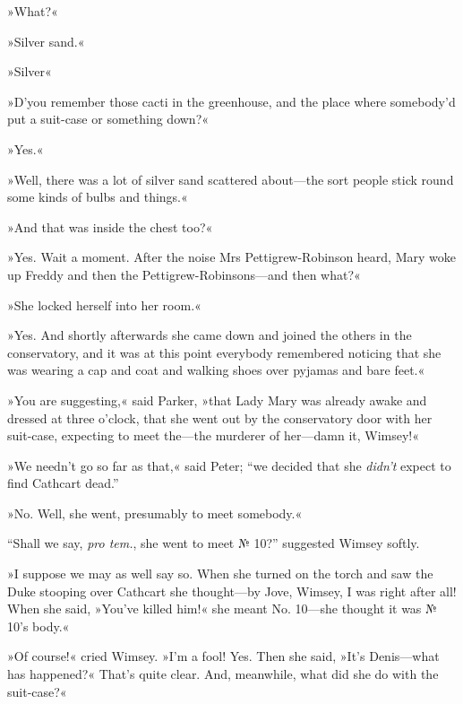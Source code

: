 »What?«

»Silver sand.«

»Silver\longdash«

»D'you remember those cacti in the greenhouse, and the place where somebody'd put a suit-case or something down?«

»Yes.«

»Well, there was a lot of silver sand scattered about\allowbreak---\allowbreak the sort people stick round some kinds of bulbs and things.«

»And that was inside the chest too?«

»Yes. Wait a moment. After the noise Mrs Pettigrew-Robinson heard, Mary woke up Freddy and then the Pettigrew-Robinsons\allowbreak---\allowbreak and then what?«

»She locked herself into her room.«

»Yes. And shortly afterwards she came down and joined the others in the conservatory, and it was at this point everybody remembered noticing that she was wearing a cap and coat and walking shoes over pyjamas and bare feet.«

»You are suggesting,« said Parker, »that Lady Mary was already awake and dressed at three o'clock, that she went out by the conservatory door with her suit-case, expecting to meet the\allowbreak---\allowbreak the murderer of her\allowbreak---\allowbreak damn it, Wimsey!«

»We needn't go so far as that,« said Peter; \enquote{we decided that she \textit{didn't} expect to find Cathcart dead.}

»No. Well, she went, presumably to meet somebody.«

\enquote{Shall we say, \textit{pro tem.}, she went to meet № 10?} suggested Wimsey softly.

»I suppose we may as well say so. When she turned on the torch and saw the Duke stooping over Cathcart she thought\allowbreak---\allowbreak by Jove, Wimsey, I was right after all! When she said, »You've killed him!« she meant No.  10\allowbreak---\allowbreak she thought it was № 10's body.«

»Of course!« cried Wimsey. »I'm a fool! Yes. Then she said, »It's Denis\allowbreak---\allowbreak what has happened?« That's quite clear. And, meanwhile, what did she do with the suit-case?«

